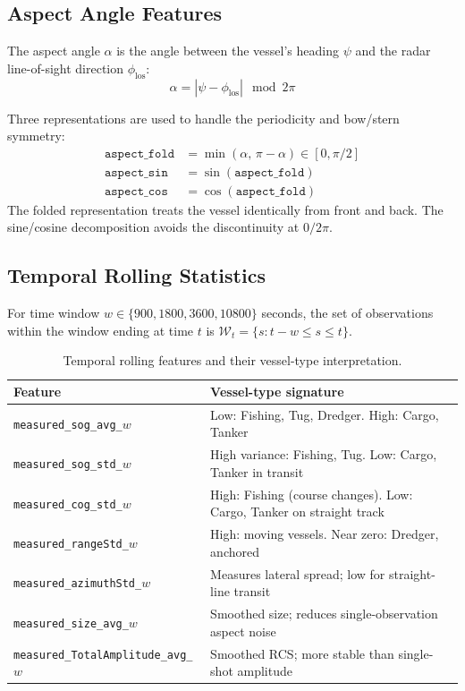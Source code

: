 \documentclass[journal]{IEEEtran}
\begin{document}
\subsection{Aspect Angle Features}

The aspect angle $\alpha$ is the angle between the vessel's heading $\psi$
and the radar line-of-sight direction $\phi_{\text{los}}$:
\begin{equation}
  \alpha = |\psi - \phi_{\text{los}}| \mod 2\pi
\end{equation}

Three representations are used to handle the periodicity and bow/stern symmetry:
\begin{align}
  \texttt{aspect\_fold}  &= \min(\alpha,\, \pi - \alpha) \in [0, \pi/2] \\
  \texttt{aspect\_sin}   &= \sin(\texttt{aspect\_fold}) \\
  \texttt{aspect\_cos}   &= \cos(\texttt{aspect\_fold})
\end{align}
The folded representation treats the vessel identically from front and back.
The sine/cosine decomposition avoids the discontinuity at $0/2\pi$.

\subsection{Temporal Rolling Statistics}

For time window $w \in \{900, 1800, 3600, 10800\}$ seconds, the set of
observations within the window ending at time $t$ is
$\mathcal{W}_t = \{s : t-w \leq s \leq t\}$.

\begin{table}[H]
\centering
\caption{Temporal rolling features and their vessel-type interpretation.}
\begin{tabular}{p{5cm}p{8.5cm}}
\toprule
\textbf{Feature} & \textbf{Vessel-type signature} \\
\midrule
\texttt{measured\_sog\_avg\_}$w$ & Low: Fishing, Tug, Dredger. High: Cargo, Tanker \\
\texttt{measured\_sog\_std\_}$w$ & High variance: Fishing, Tug. Low: Cargo, Tanker in transit \\
\texttt{measured\_cog\_std\_}$w$ & High: Fishing (course changes). Low: Cargo, Tanker on straight track \\
\texttt{measured\_rangeStd\_}$w$ & High: moving vessels. Near zero: Dredger, anchored \\
\texttt{measured\_azimuthStd\_}$w$ & Measures lateral spread; low for straight-line transit \\
\texttt{measured\_size\_avg\_}$w$ & Smoothed size; reduces single-observation aspect noise \\
\texttt{measured\_TotalAmplitude\_avg\_}$w$ & Smoothed RCS; more stable than single-shot amplitude \\
\bottomrule
\end{tabular}
\end{table}
\end{document}
